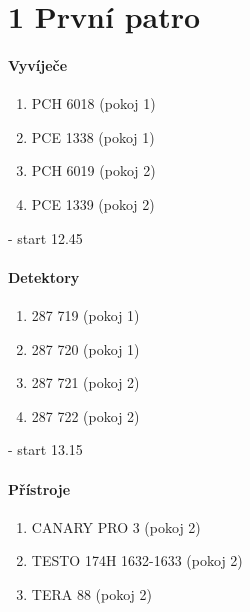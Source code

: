 \documentclass[11pt,a4paper]{article}
\begin{document}
\section*{1 První patro}
\paragraph{Vyvíječe}
	\begin{enumerate}
	\item PCH 6018 (pokoj 1)
	\item PCE 1338 (pokoj 1)
	\item PCH 6019 (pokoj 2)
	\item PCE 1339 (pokoj 2)
	\end{enumerate}
- start 12.45
\paragraph{Detektory}
	\begin{enumerate}
	\item 287 719 (pokoj 1)
	\item 287 720 (pokoj 1)
	\item 287 721 (pokoj 2)
	\item 287 722 (pokoj 2)
	\end{enumerate}
- start 13.15
\paragraph{Přístroje}
	\begin{enumerate}
	\item CANARY PRO 3 (pokoj 2)
	\item TESTO 174H 1632-1633 (pokoj 2)
	\item TERA 88 (pokoj 2)
	\end{enumerate}
\end{document}
